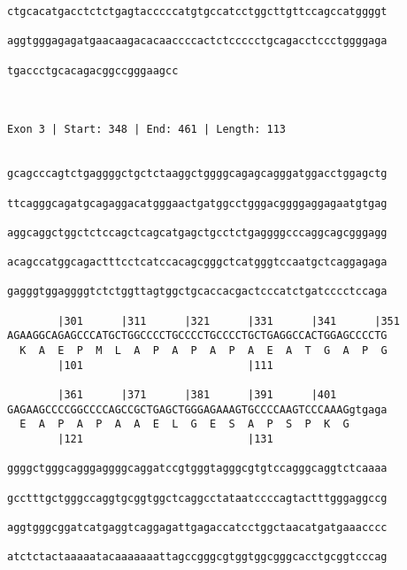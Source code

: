 \documentclass{article}
\begin{document}
\begin{Verbatim}
ctgcacatgacctctctgagtacccccatgtgccatcctggcttgttccagccatggggt
                                                            
aggtgggagagatgaacaagacacaaccccactctccccctgcagacctccctggggaga
                                                            
tgaccctgcacagacggccgggaagcc
                           
                           
 
Exon 3 | Start: 348 | End: 461 | Length: 113


gcagcccagtctgaggggctgctctaaggctggggcagagcagggatggacctggagctg
                                                            
ttcagggcagatgcagaggacatgggaactgatggcctgggacggggaggagaatgtgag
                                                            
aggcaggctggctctccagctcagcatgagctgcctctgaggggcccaggcagcgggagg
                                                            
acagccatggcagactttcctcatccacagcgggctcatgggtccaatgctcaggagaga
                                                            
gagggtggaggggtctctggttagtggctgcaccacgactcccatctgatcccctccaga
                                                            
        |301      |311      |321      |331      |341      |351
AGAAGGCAGAGCCCATGCTGGCCCCTGCCCCTGCCCCTGCTGAGGCCACTGGAGCCCCTG
  K  A  E  P  M  L  A  P  A  P  A  P  A  E  A  T  G  A  P  G
        |101                          |111                  
  
        |361      |371      |381      |391      |401        
GAGAAGCCCCGGCCCCAGCCGCTGAGCTGGGAGAAAGTGCCCCAAGTCCCAAAGgtgaga
  E  A  P  A  P  A  A  E  L  G  E  S  A  P  S  P  K  G      
        |121                          |131                  
  
ggggctgggcagggaggggcaggatccgtgggtagggcgtgtccagggcaggtctcaaaa
                                                            
gcctttgctgggccaggtgcggtggctcaggcctataatccccagtactttgggaggccg
                                                            
aggtgggcggatcatgaggtcaggagattgagaccatcctggctaacatgatgaaacccc
                                                            
atctctactaaaaatacaaaaaaattagccgggcgtggtggcgggcacctgcggtcccag
                                                            

\end{Verbatim}
\end{document}
